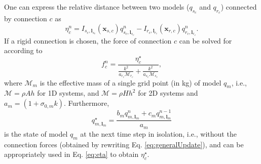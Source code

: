\documentclass{article}
\begin{document}
One can express the relative distance between two models ($q_{s_c}$ and $q_{r_c}$) connected by connection $c$ as
\begin{equation}\label{eq:eta}
    \eta_c^n =  I_{s_c,\boldsymbol{l}_{s_c}}(\boldsymbol{x}_{s,c})q_{s_c, \boldsymbol{l}_{s_c}}^n - I_{r_c,\boldsymbol{l}_{r_c}}(\boldsymbol{x}_{r,c})q_{r_c, \boldsymbol{l}_{r_c}}^n.
\end{equation}
If a rigid connection is chosen, the force of connection $c$ can be solved for according to \cite{theBible}
\begin{equation}\label{eq:rigidConnDisc}
    f_c^n = \frac{\eta^\star_c}{ \frac{k^2}{a_{r_c}\mathcal{M}_{r_c}} + \frac{k^2}{a_{s_c}\mathcal{M}_{s_c}}},
\end{equation}
where $\mathcal{M}_m$ is the effective mass of a single grid point (in kg) of model $q_m$, i.e., $\mathcal{M} = \rho A h$ for 1D systems, and $\mathcal{M} = \rho H h^2$ for 2D systems and $a_m = (1 + \sigma_{0, m}k)$. Furthermore, 
\begin{equation}
    q_{m,\boldsymbol{l}_m}^\star = \frac{b_m q_{m,\boldsymbol{l}_m}^n + c_m q_{m,\boldsymbol{l}_m}^{n-1}}{a_m}
\end{equation}
is the state of model $q_m$ at the next time step in isolation,  i.e., without the connection forces (obtained by rewriting Eq. \eqref{eq:generalUpdate}), and can be appropriately used in Eq. \eqref{eq:eta} to obtain $\eta_c^\star$.
\end{document}
